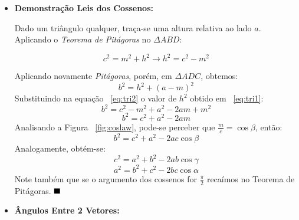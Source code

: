 \documentclass[a4paper,12pt]{article}
\begin{document}
\begin{itemize}
	\item \textbf{Demonstração Leis dos Cossenos:}
	
	Dado um triângulo qualquer, traça-se uma altura relativa ao lado $a$. Aplicando o \textit{Teorema de Pitágoras} no $\Delta ABD$:
	
	\begin{equation}
	c^{2}=m^{2}+h^{2} \rightarrow h^{2}=c^{2}-m^{2}
	\label{eq:tri1}
	\end{equation}
	
	Aplicando novamente \textit{Pitágoras}, porém, em $\Delta ADC$, obtemos:
	\begin{equation}
	b^{2}=h^{2}+(a-m)^{2}
	\label{eq:tri2}
	\end{equation}
	Substituindo na equação ~\ref{eq:tri2} o valor de $h^{2}$ obtido em ~\ref{eq:tri1}:
	$$
	b^{2}=c^{2}-m^{2}+a^{2}-2am+m^{2}
	$$
	$$
	b^{2}=c^{2}+a^{2}-2am
	$$
	Analisando a 
	Figura ~\ref{fig:coslaw}, pode-se perceber que $\frac{m}{c}=\cos\beta$, então:
	$$
	b^{2}=c^{2}+a^{2}-2ac\cos\beta
	$$
	Analogamente, obtém-se:
	$$
	c^{2}=a^{2}+b^{2}-2ab\cos\gamma
	$$
	$$
	a^{2}=b^{2}+c^{2}-2bc\cos\alpha
	$$
	Note também que se o argumento dos cossenos for $\frac{\pi}{2}$ recaímos no Teorema de Pitágoras. $\hfill\blacksquare$
	\item \textbf{Ângulos Entre 2 Vetores:}
	

\end{itemize}
\end{document}
